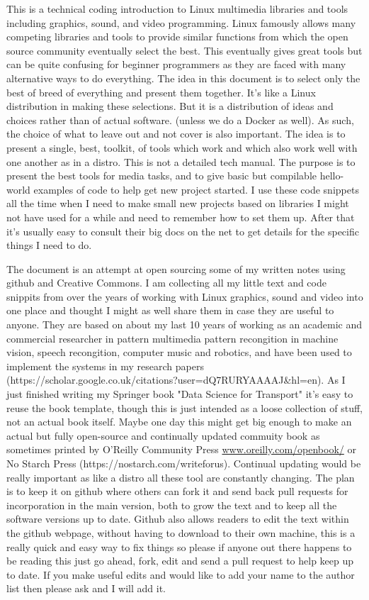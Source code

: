 \documentclass[oneside,english]{scrbook}
\begin{document}
This is a technical coding introduction to Linux multimedia libraries and tools including graphics, sound, and video programming.   Linux famously allows many competing libraries and tools to provide similar functions from which the open source community eventually select the best.  This eventually gives great tools but can be quite confusing for beginner programmers as they are faced with many alternative ways to do everything.  The idea in this document is to select only the best of breed of everything and present them together. It's like a Linux distribution in making these selections. But it is a distribution of ideas and choices rather than of actual software. (unless we do a Docker as well).   As such, the choice of what to leave out and not cover is also important. The idea is to present a single, best, toolkit, of tools which work and which also work well with one another as in a distro.   This is not a detailed tech manual. The purpose is to present the best tools for media tasks, and to give basic but compilable hello-world examples of code to help get new project started. I use these code snippets all the time when I need to make small new projects based on libraries I might not have used for a while and need to remember how to set them up.  After that it's usually easy to consult their big docs on the net to get details for the specific things I need to do.

The document is an attempt at open sourcing some of my written notes using github and Creative Commons. I am collecting all my little text and code snippits from over the years of working with Linux graphics, sound and video into one place and thought I might as well share them in case they are useful to anyone. They are based on about my last 10 years of working as an academic and commercial researcher in pattern multimedia pattern recongition in machine vision, speech recongition, computer music and robotics, and have been used to implement the systems in my research papers (https://scholar.google.co.uk/citations?user=dQ7RURYAAAAJ&hl=en). As I just finished writing my Springer book "Data Science for Transport" it's easy to reuse the book template, though this is just intended as a loose collection of stuff, not an actual book itself.    Maybe one day this might get big enough to make an actual but fully open-source and continually updated commuity book as sometimes printed by O'Reilly Community Press \url{www.oreilly.com/openbook/} or No Starch Press (https://nostarch.com/writeforus).  Continual updating would be really important as like a distro all these tool are constantly changing.    The plan is to keep it on github where others can fork it and send back pull requests for incorporation in the main version, both to grow the text and to keep all the software versions up to date. Github also allows readers to edit the text within the github webpage, without having to download to their own machine, this is a really quick and easy way to fix things so please if anyone out there happens to be reading this just go ahead, fork, edit and send a pull request to help keep up to date. If you make useful edits and would like to add your name to the author list then please ask and I will add it.
\end{document}
